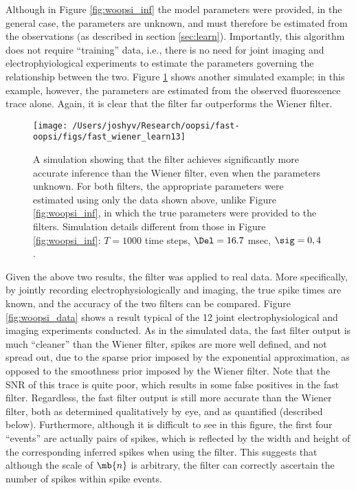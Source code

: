 Although in Figure \ref{fig:woopsi_inf} the model parameters were provided, in the general case, the parameters are unknown, and must therefore be estimated from the observations (as described in section \ref{sec:learn}). Importantly, this algorithm does not require ``training'' data, i.e., there is no need for joint imaging and electrophyiological experiments to estimate the parameters governing the relationship between the two.  Figure \ref{fig:woopsi_learn} shows another simulated example; in this example, however, the parameters are estimated from the observed fluorescence trace alone.  Again, it is clear that the \foopsi filter far outperforms the Wiener filter.

\begin{figure}[h!]
\centering \texttt{[image: /Users/joshyv/Research/oopsi/fast-oopsi/figs/fast\_wiener\_learn13]}
\caption[parameters may be estimated using the \foopsi filter]{A simulation showing that the \foopsi filter achieves significantly more accurate inference than the Wiener filter, even when the parameters unknown.  For both filters, the appropriate parameters were estimated using only the data shown above, unlike Figure \ref{fig:woopsi_inf}, in which the true parameters were provided to the filters. Simulation details different from those in Figure \ref{fig:woopsi_inf}: $T=1000$ time steps, $\Del=16.7$ msec, $\sig=0,4$.} \label{fig:woopsi_learn}
\end{figure}

Given the above two results, the \foopsi filter was applied to real data.  More specifically, by jointly recording electrophysiologically and imaging, the true spike times are known, and the accuracy of the two filters can be compared.  Figure \ref{fig:woopsi_data} shows a result typical of the 12 joint electrophysiological and imaging experiments conducted. As in the simulated data, the fast filter output is much ``cleaner'' than the Wiener filter, spikes are more well defined, and not spread out, due to the sparse prior imposed by the exponential approximation, as opposed to the smoothness prior imposed by the Wiener filter.  Note that the SNR of this trace is quite poor, which results in some false positives in the fast filter.  Regardless, the fast filter output is still more accurate than the Wiener filter, both as determined qualitatively by eye, and as quantified (described below).  Furthermore, although it is difficult to see in this figure, the first four ``events'' are actually pairs of spikes, which is reflected by the width and height of the corresponding inferred spikes when using the \foopsi filter. %
This suggests that although the scale of $\mb{n}$ is arbitrary, the \foopsi filter can correctly ascertain the number of spikes within spike events.  

